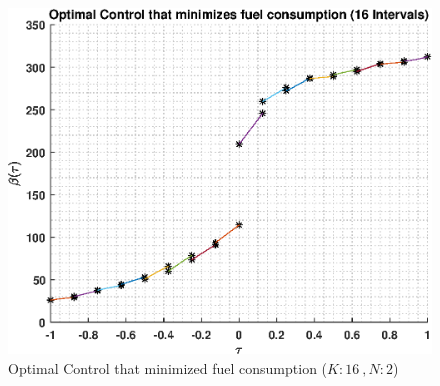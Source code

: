 \documentclass[]{article}
\begin{document}
\begin{figure}
	\centering
	\includegraphics[scale=0.75]{directControlK16Poly2.eps}
	\caption{Optimal Control that minimized fuel consumption (\(K:16\ , N:2\))}
	\label{fig:directControlK16Poly2}
\end{figure}
\FloatBarrier
\end{document}
